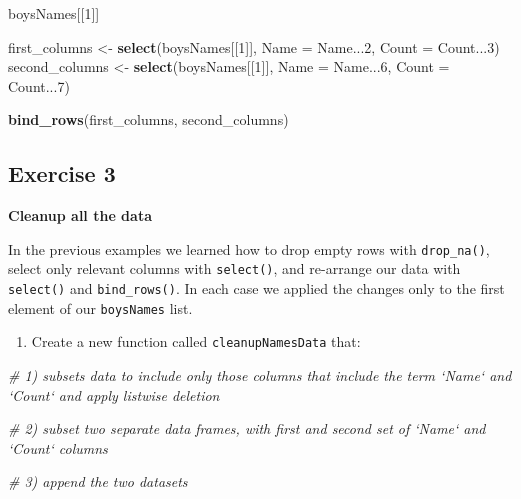\documentclass[]{book}
\newenvironment{Shaded}{\begin{snugshade}}{\end{snugshade}}
\newcommand{\CommentTok}[1]{\textcolor[rgb]{0.56,0.35,0.01}{\textit{#1}}}
\newcommand{\DataTypeTok}[1]{\textcolor[rgb]{0.13,0.29,0.53}{#1}}
\newcommand{\DecValTok}[1]{\textcolor[rgb]{0.00,0.00,0.81}{#1}}
\newcommand{\KeywordTok}[1]{\textcolor[rgb]{0.13,0.29,0.53}{\textbf{#1}}}
\newcommand{\NormalTok}[1]{#1}
\newcommand{\StringTok}[1]{\textcolor[rgb]{0.31,0.60,0.02}{#1}}
\providecommand{\tightlist}{%
  \setlength{\itemsep}{0pt}\setlength{\parskip}{0pt}}
\begin{document}
\begin{Shaded}
\begin{Highlighting}[]
\NormalTok{boysNames[[}\DecValTok{1}\NormalTok{]]}

\NormalTok{first_columns <-}\StringTok{ }\KeywordTok{select}\NormalTok{(boysNames[[}\DecValTok{1}\NormalTok{]], }\DataTypeTok{Name =}\NormalTok{ Name...}\DecValTok{2}\NormalTok{, }\DataTypeTok{Count =}\NormalTok{ Count...}\DecValTok{3}\NormalTok{)}
\NormalTok{second_columns <-}\StringTok{ }\KeywordTok{select}\NormalTok{(boysNames[[}\DecValTok{1}\NormalTok{]], }\DataTypeTok{Name =}\NormalTok{ Name...}\DecValTok{6}\NormalTok{, }\DataTypeTok{Count =}\NormalTok{ Count...}\DecValTok{7}\NormalTok{)}

\KeywordTok{bind_rows}\NormalTok{(first_columns, second_columns)}
\end{Highlighting}
\end{Shaded}

\hypertarget{exercise-3-3}{%
\subsection{Exercise 3}\label{exercise-3-3}}

\textbf{Cleanup all the data}

In the previous examples we learned how to drop empty rows with
\texttt{drop\_na()}, select only relevant columns with \texttt{select()}, and re-arrange
our data with \texttt{select()} and \texttt{bind\_rows()}. In each case we applied the
changes only to the first element of our \texttt{boysNames} list.

\begin{enumerate}
\def\labelenumi{\arabic{enumi}.}
\tightlist
\item
  Create a new function called \texttt{cleanupNamesData} that:
\end{enumerate}

\begin{Shaded}
\begin{Highlighting}[]
\CommentTok{# 1) subsets data to include only those columns that include the term `Name` and `Count` and apply listwise deletion}

\CommentTok{# 2) subset two separate data frames, with first and second set of `Name` and `Count` columns}

\CommentTok{# 3) append the two datasets}
\end{Highlighting}
\end{Shaded}
\end{document}
